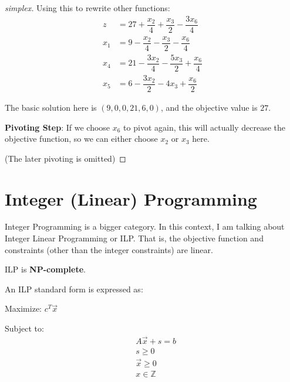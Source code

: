 \begin{proof}[simplex]
    Using this to rewrite other functions:
    \begin{align}
        z &= 27 + \dfrac{x_2}{4} + \dfrac{x_3}{2} - \dfrac{3x_6}{4} \\
        x_1 &= 9 - \dfrac{x_2}{4} - \dfrac{x_3}{2} - \dfrac{x_6}{4}  \\
        x_4 &= 21 - \dfrac{3 x_2}{4} - \dfrac{5 x_3}{2} + \dfrac{x_6}{4}  \\
        x_5 &= 6 - \dfrac{3 x_2}{2} - 4 x_3 + \dfrac{x_6}{2} 
    \end{align}

    The basic solution here is \((9, 0, 0, 21, 6, 0)\), and the objective value is \(27\). 

    \textbf{Pivoting Step}: If we choose \(x_6\) to pivot again, this will actually decrease the objective function, so we can either choose \(x_2\) or \(x_3\) here.   

    (The later pivoting is omitted)
\end{proof}

\section{Integer (Linear) Programming}

Integer Programming is a bigger category. 
In this context, I am talking about Integer Linear Programming or ILP. 
That is, the objective function and constraints (other than the integer constraints) are linear.

ILP is \textbf{NP-complete}.  

\begin{definition}[ILP]
    An ILP standard form is expressed as:

    Maximize: \(c^T \vec{x} \) 

    Subject to:
    \begin{align}
        &A \vec{x} + s = b \\
        &s \geq 0 \\
        &\vec{x} \geq 0 \\
        & x \in \mathbb{Z} 
    \end{align}
\end{definition}
